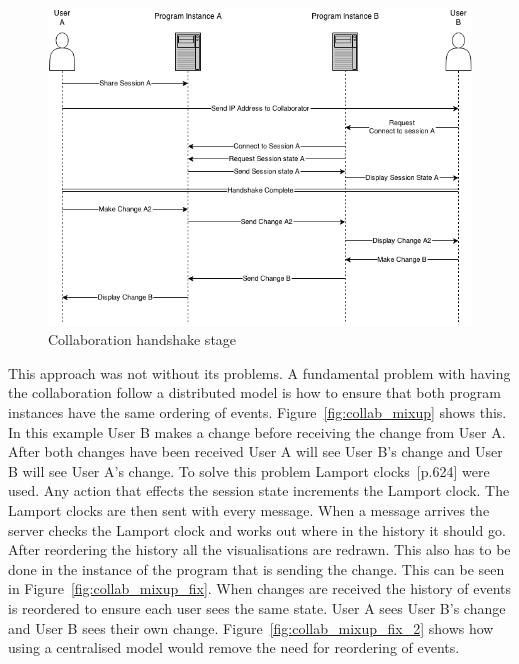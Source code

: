 \begin{figure}[h!]
    \centering
    \includegraphics[width=\textwidth]{images/minf_collab_diagram.png}
    \caption{Collaboration handshake stage}
    \label{fig:collab_handshake}
\end{figure}

This approach was not without its problems.  A fundamental problem with having the collaboration follow a distributed model is how to ensure that both program instances have the same ordering of events.  Figure~\ref{fig:collab_mixup} shows this.  In this example User B makes a change before receiving the change from User A.  After both changes have been received User A will see User B's change and User B will see User A's change.  To solve this problem Lamport clocks~\cite{coularis}[p.624] were used.  Any action that effects the session state increments the Lamport clock. The Lamport clocks are then sent with every message.  When a message arrives the server checks the Lamport clock and works out where in the history it should go.  After reordering the history all the visualisations are redrawn.  This also has to be done in the instance of the program that is sending the change.  This can be seen in Figure~\ref{fig:collab_mixup_fix}.  When changes are received the history of events is reordered to ensure each user sees the same state.  User A sees User B's change and User B sees their own change.  Figure~\ref{fig:collab_mixup_fix_2} shows how using a centralised model would remove the need for reordering of events.

